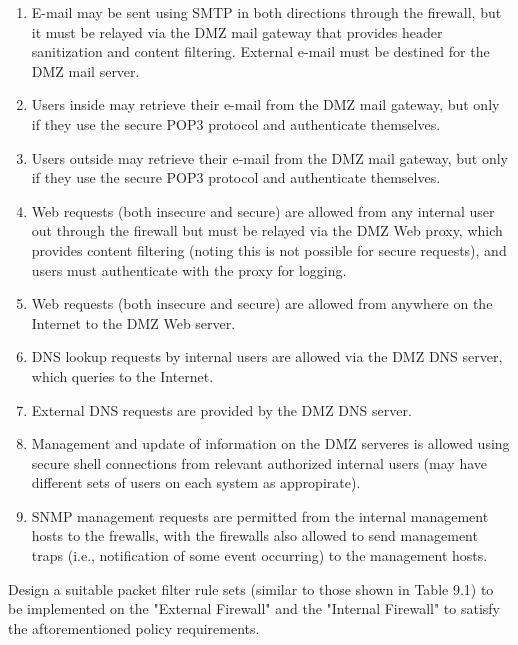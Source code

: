 \documentclass[12pt]{article}
\begin{document}
\begin{enumerate}
  \begin{enumerate}
    \item E-mail may be sent using SMTP in both directions through the firewall, but it must be relayed via the DMZ mail gateway that provides header sanitization and content filtering. External e-mail must be destined for the DMZ mail server.
    \item Users inside may retrieve their e-mail from the DMZ mail gateway, but only if they use the secure POP3 protocol and authenticate themselves.
    \item Users outside may retrieve their e-mail from the DMZ mail gateway, but only if they use the secure POP3 protocol and authenticate themselves.
    \item Web requests (both insecure and secure) are allowed from any internal user out through the firewall but must be relayed via the DMZ Web proxy, which provides content filtering (noting this is not possible for secure requests), and users must authenticate with the proxy for logging.
    \item Web requests (both insecure and secure) are allowed from anywhere on the Internet to the DMZ Web server.
    \item DNS lookup requests by internal users are allowed via the DMZ DNS server, which queries to the Internet.
    \item External DNS requests are provided by the DMZ DNS server.
    \item Management and update of information on the DMZ serveres is allowed using secure shell connections from relevant authorized internal users (may have different sets of users on each system as appropirate).
    \item SNMP management requests are permitted from the internal management hosts to the frewalls, with the firewalls also allowed to send management traps (i.e., notification of some event occurring) to the management hosts.
  \end{enumerate}

  Design a suitable packet filter rule sets (similar to those shown in Table 9.1) to be implemented on the "External Firewall" and the "Internal Firewall" to satisfy the aftorementioned policy requirements.


\end{enumerate}
\end{document}
